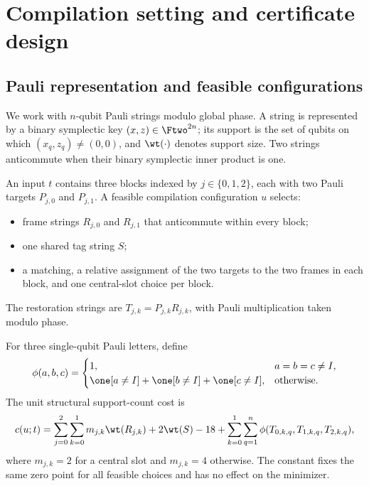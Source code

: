 \section{Compilation setting and certificate design}
\label{sec:setting}

\subsection{Pauli representation and feasible configurations}

We work with $n$-qubit Pauli strings modulo global phase. A string is represented by a binary symplectic key $(x,z)\in\Ftwo^{2n}$; its support is the set of qubits on which $(x_q,z_q)\neq(0,0)$, and $\wt(\cdot)$ denotes support size. Two strings anticommute when their binary symplectic inner product is one.

An input $t$ contains three blocks indexed by $j\in\{0,1,2\}$, each with two Pauli targets $P_{j,0}$ and $P_{j,1}$. A feasible compilation configuration $u$ selects:
\begin{itemize}
  \item frame strings $R_{j,0}$ and $R_{j,1}$ that anticommute within every block;
  \item one shared tag string $S$;
  \item a matching, a relative assignment of the two targets to the two frames in each block, and one central-slot choice per block.
\end{itemize}
The restoration strings are $T_{j,k}=P_{j,k}R_{j,k}$, with Pauli multiplication taken modulo phase.

For three single-qubit Pauli letters, define
\begin{equation}
\phi(a,b,c)=
\begin{cases}
1, & a=b=c\neq I,\\
\one[a\neq I]+\one[b\neq I]+\one[c\neq I], & \text{otherwise}.
\end{cases}
\label{eq:phi}
\end{equation}
The unit structural support-count cost is
\begin{equation}
 c(u;t)=\sum_{j=0}^{2}\sum_{k=0}^{1}m_{j,k}\wt(R_{j,k})
 +2\wt(S)-18
 +\sum_{k=0}^{1}\sum_{q=1}^{n}\phi(T_{0,k,q},T_{1,k,q},T_{2,k,q}),
\label{eq:cost}
\end{equation}
where $m_{j,k}=2$ for a central slot and $m_{j,k}=4$ otherwise. The constant fixes the same zero point for all feasible choices and has no effect on the minimizer.

